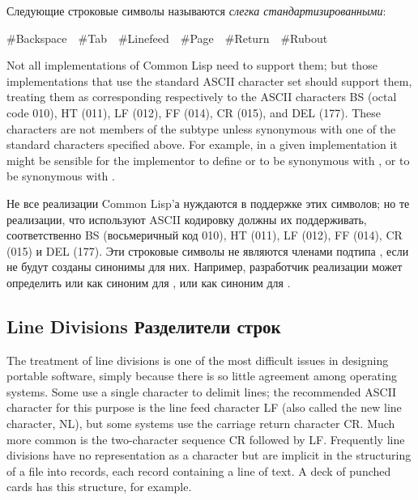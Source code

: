 Следующие строковые символы называются \emph{слегка стандартизированными}:
\begin{lisp}
\#{\Xbackslash}Backspace~~\#{\Xbackslash}Tab~~\#{\Xbackslash}Linefeed~~\#{\Xbackslash}Page~~\#{\Xbackslash}Return~~\#{\Xbackslash}Rubout
\end{lisp}
Not all implementations of Common Lisp need to support them; but those
implementations that
use the standard ASCII character set should support them, treating them as
corresponding respectively to the ASCII characters BS (octal code 010),
HT (011), LF (012), FF (014), CR (015), and DEL
(177). These characters are not
members of the subtype  unless synonymous with
one of the standard characters specified above.
For example, in a given implementation it might
be sensible for the implementor to define
 or  to be synonymous with ,
or  to be synonymous with .

Не все реализации Common Lisp'а нуждаются в поддержке этих символов; но те
реализации, что используют ASCII кодировку должны их поддерживать,
соответственно BS (восьмеричный код 010), HT (011), LF (012), FF (014), CR
(015) и DEL (177). Эти строковые символы не являются членами подтипа
, если не будут созданы синонимы для них.
Например, разработчик реализации может 
определить  или  как
синоним для ,
или  как синоним для .

\subsection{Line Divisions Разделители строк}

The treatment of line divisions is one of the most difficult issues
in designing portable software, simply because there is so little agreement
among operating systems.  Some use a single character to delimit lines;
the recommended ASCII character for this purpose is the line feed character
LF (also called the new line character, NL),
but some systems use the carriage
return character CR.  Much more common is the two-character sequence
CR followed by LF.  Frequently line divisions have no representation
as a character but are implicit in the structuring of a file into records,
each record containing a line of text.  A deck of punched cards has this
structure, for example.

